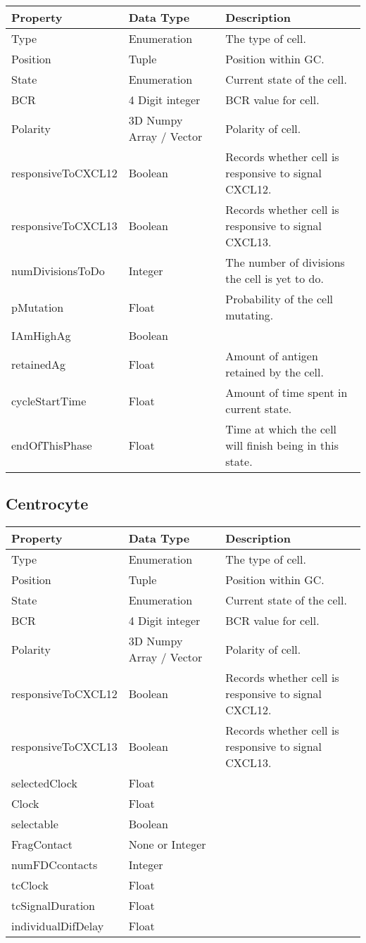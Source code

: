 \documentclass[english]{article}
\begin{document}
\begin{center}
\begin{tabular}{|C{2.1in}|C{2.1in}|C{2.1in}|}

\hline
\textbf{Property} & \textbf{Data Type} & \textbf{Description}
\tabularnewline
\hline
\hline
Type & Enumeration & The type of cell. 
\tabularnewline
\hline
Position & Tuple & Position within GC.
\tabularnewline
\hline
State & Enumeration & Current state of the cell. 
\tabularnewline
\hline
BCR & 4 Digit integer & BCR value for cell.
\tabularnewline
\hline
Polarity & 3D Numpy Array / Vector & Polarity of cell.
\tabularnewline
\hline
responsiveToCXCL12 & Boolean & Records whether cell is responsive to signal CXCL12.
\tabularnewline
\hline
responsiveToCXCL13 & Boolean & Records whether cell is responsive to signal CXCL13.
\tabularnewline
\hline
numDivisionsToDo & Integer & The number of divisions the cell is yet to do. 
\tabularnewline
\hline 
pMutation & Float & Probability of the cell mutating. 
\tabularnewline
\hline
IAmHighAg & Boolean & 
\tabularnewline
\hline
retainedAg & Float & Amount of antigen retained by the cell. 
\tabularnewline
\hline
cycleStartTime & Float & Amount of time spent in current state. 
\tabularnewline
\hline
endOfThisPhase & Float & Time at which the cell will finish being in this state. 
\tabularnewline
\hline

\end{tabular}
\end{center}


\subsection{Centrocyte}

\begin{center}
\begin{tabular}{|C{2.1in}|C{2.1in}|C{2.1in}|}

\hline
\textbf{Property} & \textbf{Data Type} & \textbf{Description}
\tabularnewline
\hline
\hline
Type & Enumeration & The type of cell. 
\tabularnewline
\hline
Position & Tuple & Position within GC.
\tabularnewline
\hline
State & Enumeration & Current state of the cell. 
\tabularnewline
\hline
BCR & 4 Digit integer & BCR value for cell.
\tabularnewline
\hline
Polarity & 3D Numpy Array / Vector & Polarity of cell.
\tabularnewline
\hline
responsiveToCXCL12 & Boolean & Records whether cell is responsive to signal CXCL12.
\tabularnewline
\hline
responsiveToCXCL13 & Boolean & Records whether cell is responsive to signal CXCL13.
\tabularnewline
\hline
selectedClock & Float &
\tabularnewline
\hline
Clock & Float &
\tabularnewline
\hline
selectable & Boolean &
\tabularnewline
\hline
FragContact & None or Integer & 
\tabularnewline
\hline
numFDCcontacts & Integer &
\tabularnewline
\hline
tcClock & Float &
\tabularnewline
\hline
tcSignalDuration & Float &
\tabularnewline
\hline
individualDifDelay & Float &
\tabularnewline
\hline
\end{tabular}
\end{center}
\end{document}
